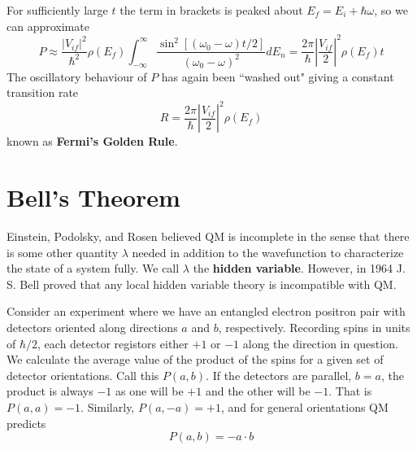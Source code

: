\documentclass[12pt, a4paper, oneside, openright, titlepage]{book}
\begin{document}
For sufficiently large $t$ the term in brackets is peaked about $E_f = E_i+\hbar\omega$, so we can approximate $$P\approx \frac{|V_{if}|^2}{\hbar^2}\rho(E_f)\int_{-\infty}^{\infty}\frac{\sin^2[(\omega_0-\omega)t/2]}{(\omega_0-\omega)^2}dE_n = \frac{2\pi}{\hbar}\left|\frac{V_{if}}{2}\right|^2\rho(E_f)t$$
The oscillatory behaviour of $P$ has again been ``washed out" giving a constant transition rate $$R = \frac{2\pi}{\hbar}\left|\frac{V_{if}}{2}\right|^2\rho(E_f)$$
known as \textbf{Fermi's Golden Rule}.


\section{Bell's Theorem}

Einstein, Podolsky, and Rosen believed QM is incomplete in the sense that there is some other quantity $\lambda$ needed in addition to the wavefunction to characterize the state of a system fully. We call $\lambda$ the \textbf{hidden variable}. However, in 1964 J. S. Bell proved that any local hidden variable theory is incompatible with QM.

Consider an experiment where we have an entangled electron positron pair with detectors oriented along directions $a$ and $b$, respectively. Recording spins in units of $\hbar/2$, each detector registors either $+1$ or $-1$ along the direction in question. We calculate the average value of the product of the spins for a given set of detector orientations. Call this $P(a,b)$. If the detectors are parallel, $b=a$, the product is always $-1$ as one will be $+1$ and the other will be $-1$. That is $P(a,a) = -1$. Similarly, $P(a,-a) = +1$, and for general orientations QM predicts $$P(a,b) = -a\cdot b$$
\end{document}
